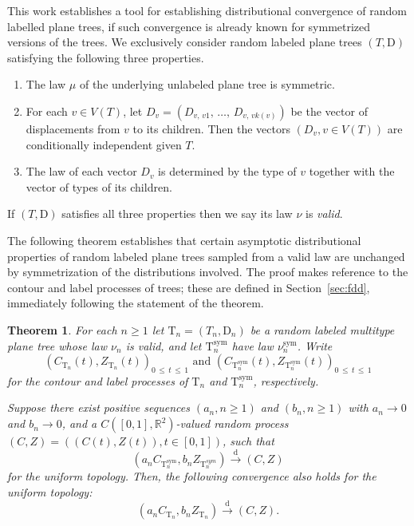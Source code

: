 \documentclass[10pt]{amsart}
\newtheorem{theo}{Theorem}[section]
\theoremstyle{definition}\newtheorem{defi}[theo]{Definition}\newtheorem{rema}[theo]{Remark}\newtheorem{exam}[theo]{Example}\newtheorem{exem}[theo]{Example}\newtheorem{nota}[theo]{Notation}
\providecommand{\R}{}
\renewcommand{\R}{\mathbb{R}}
\newcommand{\rD}{\mathrm{D}}
\newcommand{\rT}{\mathrm{T}}
\DeclareMathOperator{\sym}{sym}
\newcommand{\convdist}{\ensuremath{\stackrel{\mathrm{d}}{\rightarrow}}}
\newcommand*{\romanenumi}{\renewcommand*{\theenumi}{\roman{enumi}}}
\begin{document}
This work establishes a tool for establishing distributional convergence of random labelled plane trees, if such convergence is already known for symmetrized versions of the trees. We exclusively consider random labeled plane trees $(T,\rD)$ satisfying the following three properties.
\begin{enumerate}\romanenumi
\item \label{1.2.i} The law $\mu$ of the underlying unlabeled plane tree is symmetric.
\item \label{1.2.ii}For each $v \in V(T)$, let $D_v = (D_{v,\,v1},\,\ldots,\,D_{v,\,vk(v)})$ be the vector of displacements from $v$ to its children. Then the vectors $(D_v,v \in V(T))$ are conditionally independent given $T$.
\item \label{1.2.iii}The law of each vector $D_v$ is determined by the type of $v$ together with the vector of types of its children.
\end{enumerate}
If $(T,\rD)$ satisfies all three properties then we say its law $\nu$ is \emph{valid}.

The following theorem establishes that certain asymptotic distributional properties of random labeled plane trees sampled from a valid law are unchanged by symmetrization of the distributions involved. The proof makes reference to the contour and label processes of trees; these are defined in Section~\ref{sec:fdd}, immediately following the statement of the theorem.


\begin{theo}\label{thm:main}
For each $n \ge 1$ let $\rT_n=(T_n,\rD_n)$ be a random labeled multitype plane tree whose law $\nu_n$ is valid, and let $\rT_n^{\sym}$ have law $\nu_n^{\sym}$. Write
\[
\left(C_{\rT_n}(t),Z_{\rT_n}(t)\right)_{0\,\leq\,t\,\leq\,1}\text{ and }\left(C_{\rT_n^{\sym}}(t),Z_{\rT_n^{\sym}}(t)\right)_{0\,\leq\,t\,\leq\, 1}
\]
for the contour and label processes of $\rT_n$ and $\rT_n^{\sym}$, respectively.

Suppose there exist positive sequences $(a_n,n \ge 1)$ and $(b_n,n \ge 1)$ with $a_n \to 0$ and $b_n \to 0$, and a $C([0,1],\R^2)$-valued random process $(C,Z)=((C(t),Z(t)),t \in [0,1])$, such that
\[
\left(a_nC_{\rT_n^{\sym}},b_nZ_{\rT_n^{sym}}\right) \convdist (C,Z)
\]
for the uniform topology. Then, the following convergence also holds for the uniform topology:
\[
\left(a_nC_{\rT_n},b_nZ_{\rT_n}\right) \convdist (C,Z).
\]
\end{theo}
\end{document}
